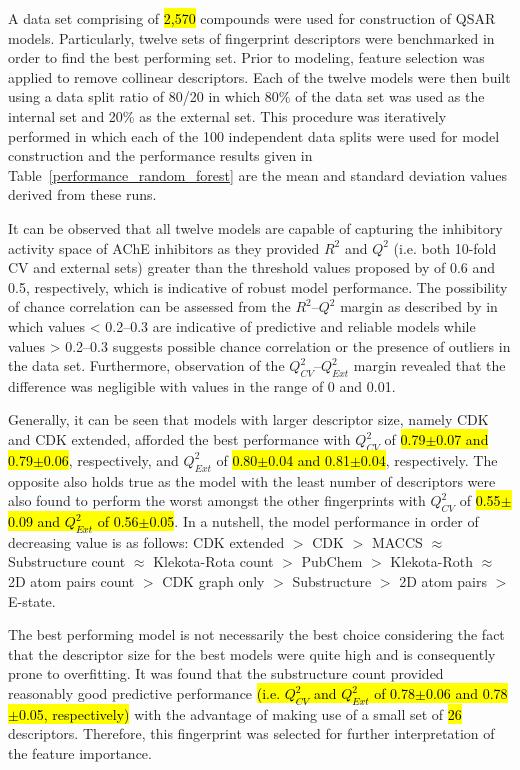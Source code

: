 \documentclass[fleqn,10pt]{wlpeerj}
\begin{document}
A data set comprising of \hl{2,570} compounds were used for construction of QSAR models. Particularly, twelve sets of fingerprint descriptors were benchmarked in order to find the best performing set. Prior to modeling, feature selection was applied to remove collinear descriptors. Each of the twelve models were then built using a data split ratio of 80/20 in which 80\% of the data set was used as the internal set and 20\% as the external set. This procedure was iteratively performed in which each of the 100 independent data splits were used for model construction and the performance results given in Table~\ref{performance_random_forest} are the mean and standard deviation values derived from these runs.

It can be observed that all twelve models are capable of capturing the inhibitory activity space of AChE inhibitors as they provided $R^{2}$ and $Q^{2}$ (i.e. both 10-fold CV and external sets) greater than the threshold values proposed by \cite{golbraikh2002beware} of 0.6 and 0.5, respectively, which is indicative of robust model performance. The possibility of chance correlation can be assessed from the $R^{2}$--$Q^{2}$ margin as described by \cite{eriksson1996multivariate} in which values < 0.2--0.3 are indicative of predictive and reliable models while values > 0.2--0.3 suggests possible chance correlation or the presence of outliers in the data set. Furthermore, observation of the $Q^{2}_{CV}$--$Q^{2}_{Ext}$ margin revealed that the difference was negligible with values in the range of 0 and 0.01.

Generally, it can be seen that models with larger descriptor size, namely CDK and CDK extended, afforded the best performance with $Q^{2}_{CV}$ of \hl{0.79$\pm$0.07 and 0.79$\pm$0.06}, respectively, and $Q^{2}_{Ext}$ of \hl{0.80$\pm$0.04 and 0.81$\pm$0.04}, respectively. The opposite also holds true as the model with the least number of descriptors were also found to perform the worst amongst the other fingerprints with $Q^{2}_{CV}$ of \hl{0.55$\pm$0.09 and $Q^{2}_{Ext}$ of 0.56$\pm$0.05}. In a nutshell, the model performance in order of decreasing value is as follows: CDK extended $>$ CDK $>$ MACCS ${\approx}$ Substructure count ${\approx}$ Klekota-Rota count $>$ PubChem $>$ Klekota-Roth ${\approx}$ 2D atom pairs count $>$ CDK graph only $>$ Substructure $>$ 2D atom pairs $>$ E-state.

The best performing model is not necessarily the best choice considering the fact that the descriptor size for the best models were quite high and is consequently prone to overfitting. It was found that the substructure count provided reasonably good predictive performance \hl{(i.e. $Q^{2}_{CV}$ and $Q^{2}_{Ext}$ of 0.78$\pm$0.06 and 0.78$\pm$0.05, respectively)} with the advantage of making use of a small set of \hl{26} descriptors. Therefore, this fingerprint was selected for further interpretation of the feature importance.
\end{document}
